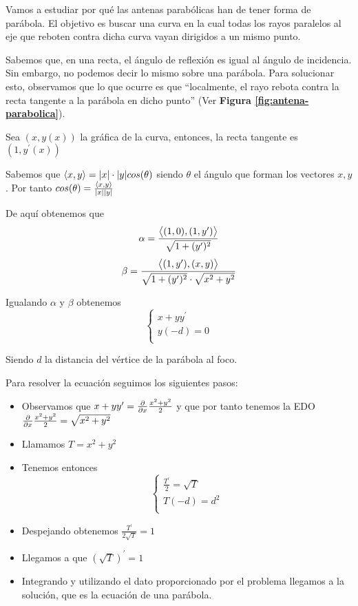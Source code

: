 \begin{example}
Vamos a estudiar por qué las antenas parabólicas han de tener forma de parábola. El objetivo es buscar una curva en la cual todas los rayos paralelos al eje que reboten contra dicha curva vayan dirigidos a un mismo punto.

Sabemos que, en una recta, el ángulo de reflexión es igual al ángulo de incidencia. Sin embargo, no podemos decir lo mismo sobre una parábola. Para solucionar esto, observamos que lo que ocurre es que ``localmente, el rayo rebota contra la recta tangente a la parábola en dicho punto'' (Ver \textbf{Figura \ref{fig:antena-parabolica}}).

Sea $(x,y(x))$ la gráfica de la curva, entonces, la recta tangente es $(1, y^\prime(x))$

Sabemos que $\left\langle x,y\right\rangle=|x|\cdot|y|cos(\theta)$ siendo $\theta$ el ángulo que forman los vectores $x,y$. Por tanto $cos(\theta)=\frac{\left\langle x,y\right\rangle}{|x||y|}$

De aquí obtenemos que
$$\alpha = \frac{\left\langle (1,0),(1,y^\prime)\right\rangle}{\sqrt{1+(y^\prime)^2}}$$
$$\beta = \frac{\left\langle (1,y^\prime),(x,y)\right\rangle}{\sqrt{1+(y^\prime)^2}\cdot\sqrt{x^2+y^2}}$$

Igualando $\alpha$ y $\beta$ obtenemos
\begin{equation*}
  \left\lbrace
  \begin{array}{l}
     x+yy^\prime \\
     y(-d) = 0  \\
  \end{array}
  \right.
\end{equation*}

Siendo $d$ la distancia del vértice de la parábola al foco.

Para resolver la ecuación seguimos los siguientes pasos:
\begin{itemize}
\item Observamos que $x+yy^\prime = \frac{\partial}{\partial x}\frac{x^2+y^2}{2}$ y que por tanto tenemos la EDO $\frac{\partial}{\partial x}\frac{x^2+y^2}{2}=\sqrt{x^2+y^2}$
\item Llamamos $T=x^2+y^2$
\item Tenemos entonces
\begin{equation*}
  \left\lbrace
  \begin{array}{l}
     \frac{T^\prime}{2} = \sqrt{T} \\
     T(-d) = d^2  \\
  \end{array}
  \right.
\end{equation*}
\item Despejando obtenemos $\frac{T^\prime}{2\sqrt{T}} = 1$
\item Llegamos a que $(\sqrt{T})^\prime = 1$
\item Integrando y utilizando el dato proporcionado por el problema llegamos a la solución, que es la ecuación de una parábola.
\end{itemize}
\end{example}

